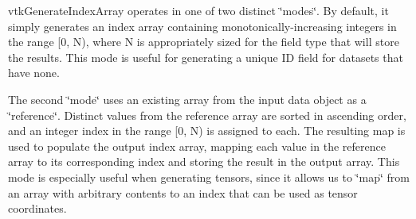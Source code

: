 vtk\-Generate\-Index\-Array operates in one of two distinct \char`\"{}modes\char`\"{}. By default, it simply generates an index array containing monotonically-\/increasing integers in the range \mbox{[}0, N), where N is appropriately sized for the field type that will store the results. This mode is useful for generating a unique I\-D field for datasets that have none.

The second \char`\"{}mode\char`\"{} uses an existing array from the input data object as a \char`\"{}reference\char`\"{}. Distinct values from the reference array are sorted in ascending order, and an integer index in the range \mbox{[}0, N) is assigned to each. The resulting map is used to populate the output index array, mapping each value in the reference array to its corresponding index and storing the result in the output array. This mode is especially useful when generating tensors, since it allows us to \char`\"{}map\char`\"{} from an array with arbitrary contents to an index that can be used as tensor coordinates.

